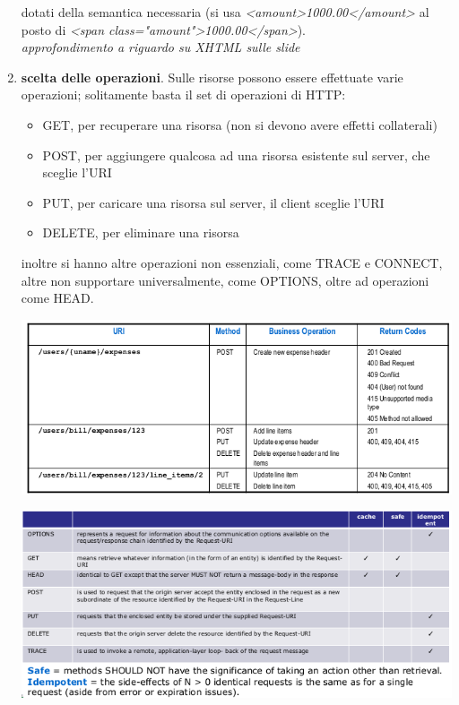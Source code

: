 \documentclass[a4paper,12pt, oneside]{book}
\begin{document}
\begin{enumerate}
  dotati della semantica necessaria (si usa \textit{<amount>1000.00</amount>} al posto di \textit{<span class="amount">1000.00</span>}).\\
  \textit{approfondimento a riguardo su XHTML sulle slide}
\item \textbf{scelta delle operazioni}. Sulle risorse possono essere effettuate varie operazioni; solitamente basta il set di operazioni di HTTP:
  \begin{itemize}
  \item GET, per recuperare una risorsa (non si devono avere effetti collaterali)
  \item POST, per aggiungere qualcosa ad una risorsa esistente sul server, che sceglie l'URI
  \item PUT, per caricare una risorsa sul server, il client sceglie l'URI
  \item DELETE, per eliminare una risorsa
  \end{itemize}
  inoltre si hanno altre operazioni non essenziali, come TRACE e CONNECT, altre non supportare universalmente, come OPTIONS, oltre ad operazioni come HEAD.\\
  \begin{center}
    \includegraphics[scale=0.7]{img/app1.png}
  \end{center}
  \begin{center}
    \includegraphics[scale=0.7]{img/app2.png}
  \end{center}

\end{enumerate}
\end{document}
